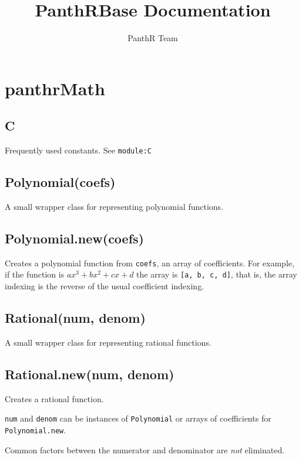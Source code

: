\documentclass{article}
\title{PanthRBase Documentation}
\author{PanthR Team}
\begin{document}
\maketitle

\tableofcontents

  \section{panthrMath}
    \subsection*{C}
    Frequently used constants.  See \texttt{module:C}


    \subsection*{Polynomial(coefs)}
    A small wrapper class for representing polynomial functions.


    \subsection*{Polynomial.new(coefs)}
    Creates a polynomial function from \texttt{coefs}, an array of coefficients.
For example, if the function is $ax^3 + bx^2 + cx + d$
the array is \texttt{[a, b, c, d]}, that is, the array indexing is
the reverse of the usual coefficient indexing.


    \subsection*{Rational(num, denom)}
    A small wrapper class for representing rational functions.


    \subsection*{Rational.new(num, denom)}
    Creates a rational function.


\texttt{num} and \texttt{denom} can be instances of \texttt{Polynomial}
or arrays of coefficients for \texttt{Polynomial.new}.


Common factors between the numerator and denominator are \emph{not}
eliminated.
\end{document}

